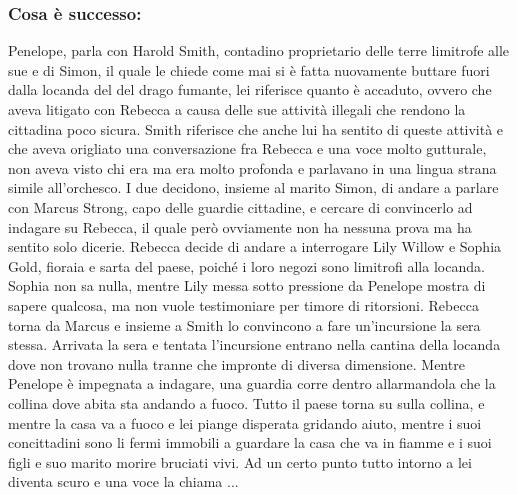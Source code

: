 \documentclass{article}
\begin{document}
\subsubsection*{Cosa è successo: }
Penelope, parla con Harold Smith, contadino proprietario delle terre limitrofe alle sue e di Simon, il quale le chiede come mai si è fatta nuovamente buttare fuori dalla locanda del 
del drago fumante, lei riferisce quanto è accaduto, ovvero che aveva litigato con Rebecca a causa delle sue attività illegali che rendono la cittadina poco sicura. Smith riferisce che anche lui ha sentito di queste attività e che aveva origliato una conversazione
fra Rebecca e una voce molto gutturale, non aveva visto chi era ma era molto profonda e parlavano in una lingua strana simile all'orchesco. I due decidono, insieme al marito Simon, di andare a parlare con 
Marcus Strong, capo delle guardie cittadine, e cercare di convincerlo ad indagare su Rebecca, il quale però ovviamente non ha nessuna prova ma ha sentito solo dicerie. Rebecca decide di andare a interrogare 
Lily Willow e Sophia Gold, fioraia e sarta del paese, poiché i loro negozi sono limitrofi alla locanda. Sophia non sa nulla, mentre Lily messa sotto pressione da Penelope mostra di sapere qualcosa, ma non vuole testimoniare per timore di ritorsioni.
Rebecca torna da Marcus e insieme a Smith lo convincono a fare un'incursione la sera stessa. Arrivata la sera e tentata l'incursione entrano nella cantina della locanda dove non trovano nulla tranne che impronte di diversa dimensione. Mentre Penelope è impegnata a indagare, una guardia corre dentro allarmandola che la collina 
dove abita sta andando a fuoco. Tutto il paese torna su sulla collina, e mentre la casa va a fuoco e lei piange disperata gridando aiuto, mentre i suoi concittadini sono 
li fermi immobili a guardare la casa che va in fiamme e i suoi figli e suo marito morire bruciati vivi. Ad un certo punto tutto intorno a lei diventa scuro e una voce la chiama ... 
\end{document}

